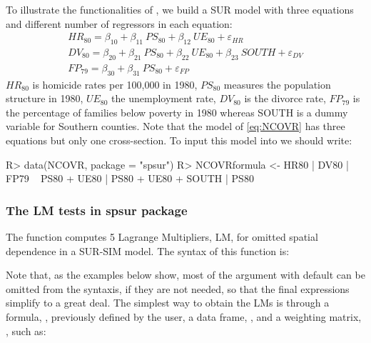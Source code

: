 \documentclass[article]{jss}
\begin{document}
To illustrate the functionalities of , we build a SUR model with three equations and different number of regressors in each equation:
\begin{equation}
\begin{array}{lll}
HR_{80} = \beta_{10} + \beta_{11} \ PS_{80} + \beta_{12} \ UE_{80} + \varepsilon_{HR} \\
DV_{80} = \beta_{20} + \beta_{21} \ PS_{80} + \beta_{22} \ UE_{80} + \beta_{23} \  SOUTH + \varepsilon_{DV} \\
FP_{79} = \beta_{30} + \beta_{31} \ PS_{80}+ \varepsilon_{FP}
\end{array}
\label{eq:NCOVR}
\end{equation}
\(HR_{80}\) is homicide rates per 100,000 in 1980, \(PS_{80}\) measures the population structure in 1980, \(UE_{80}\) the unemployment rate, \(DV_{80}\) is the divorce rate, \(FP_{79}\) is the percentage of families below poverty in 1980 whereas SOUTH is a dummy variable for Southern counties. Note that the model of \eqref{eq:NCOVR} has three equations but only one cross-section. To input this model into  we should write:

\begin{CodeChunk}

\begin{CodeInput}
R> data(NCOVR, package = "spsur")
R> NCOVRformula <- HR80 | DV80 | FP79 ~ PS80 + UE80 | PS80 + UE80 + SOUTH | PS80
\end{CodeInput}
\end{CodeChunk}

\hypertarget{lmtests}{%
\subsubsection{The LM tests in spsur package}\label{lmtests}}

The function  computes 5 Lagrange Multipliers, LM, for omitted spatial dependence in a SUR-SIM model. The syntax of this function is:


Note that, as the examples below show, most of the argument with  default can be omitted from the syntaxis, if they are not needed, so that the final expressions simplify to a great deal. The simplest way to obtain the LMs is through a formula, , previously defined by the user, a data frame, , and a weighting matrix, , such as:
\end{document}
